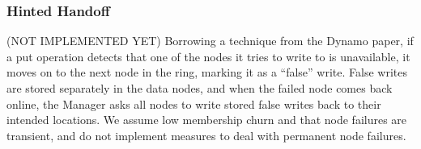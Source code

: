 \documentclass[paper=a4,fontsize=11pt]{report} %
\numberwithin{equation}{section} %
\numberwithin{figure}{section} %
\numberwithin{table}{section} %
\begin{document}
\subsubsection{Hinted Handoff} (NOT IMPLEMENTED YET)
Borrowing a technique from the Dynamo paper, if a put operation detects that one of the nodes it tries to write to is unavailable, it moves on to the next node in the ring, marking it as a ``false'' write. False writes are stored separately in the data nodes, and when the failed node comes back online, the Manager asks all nodes to write stored false writes back to their intended locations. We assume low membership churn and that node failures are transient, and do not implement measures to deal with permanent node failures.
\end{document}
